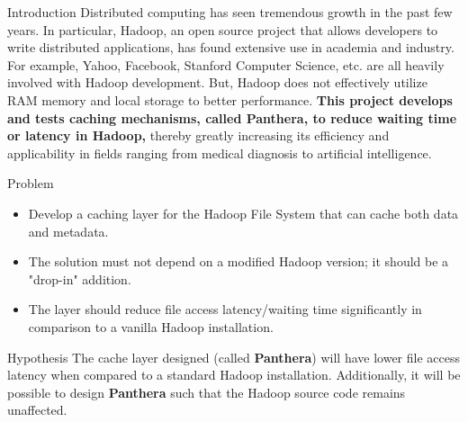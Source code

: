 \documentclass[final]{beamer} %
\begin{document}
  \begin{frame}
    \begin{center}

      \textcolor{black}{
      \textbf{}}
    \end{center}
    
    \begin{columns}[t]
     \begin{column}{0.32\textwidth}
      \begin{block}{Introduction}
      Distributed computing has seen tremendous growth in the past few years.
In particular, Hadoop, an open source project that allows developers to
write distributed applications, has found extensive use in academia and industry. For example, Yahoo, Facebook, Stanford Computer Science, etc. are all heavily involved with Hadoop development. But, Hadoop does not effectively utilize RAM memory and local storage to better performance. \textbf{This project develops and tests caching mechanisms, called \textbf{Panthera}, to reduce waiting time or latency in Hadoop, } thereby greatly increasing its efficiency and applicability in fields ranging from medical diagnosis to artificial intelligence. 
      \end{block}
      
    \begin{block}{Problem}
	\begin{itemize}
	 \item Develop a caching layer for the Hadoop File System that can cache both data and metadata.
	 \item The solution must not depend on a modified Hadoop version; it should be a "drop-in" addition.
	 \item The layer should reduce file access latency/waiting time significantly in comparison to a vanilla Hadoop installation.
	\end{itemize}

      \end{block}

      \begin{block}{Hypothesis}
       The cache layer designed (called \textbf{Panthera}) will have lower file
       access latency when compared to a standard Hadoop installation. Additionally, it
       will be possible to design \textbf{Panthera} such that the Hadoop source code
       remains unaffected.
      \end{block}
	  

\end{column}
\end{columns}
\end{frame}
\end{document}
